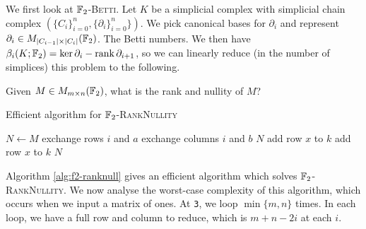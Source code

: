 We first look at \textsc{$\F_2$-Betti}. Let $K$ be a simplicial complex with simplicial chain complex $(\{C_i\}_{i=0}^n, \{\partial_i\}_{i=0}^n\})$. We pick canonical bases for $\partial_i$ and represent $\partial_i \in M_{\lvert C_{i-1} \rvert \times \lvert C_i \rvert}(\mathbb{F}_2)$. The Betti numbers. We then have $\beta_i(K; \mathbb{F}_2) = \ker\partial_i - \operatorname*{rank}\partial_{i+1}$, so we can linearly reduce (in the number of simplices) this problem to the following.

\begin{problem}[$\F_2$-RankNullity]
Given $M \in M_{m \times n}(\mathbb{F}_2)$, what is the rank and nullity of $M$?
\end{problem}

\begin{algorithm}
  \caption{Efficient algorithm for \textsc{$\F_2$-RankNullity}}
  \label{alg:f2-ranknull}
  \begin{algorithmic}[1]
      \State $N \gets M$
            \State exchange rows $i$ and $a$
            \State exchange columns $i$ and $b$
          \Else
            \State\Return $N$
          \EndIf
        \EndIf
         
            \State add row $x$ to $k$
          \EndIf
        \EndFor
         
            \State add row $x$ to $k$
          \EndIf
        \EndFor
      \EndFor
      \State\Return $N$
    \EndFunction
  \end{algorithmic}
\end{algorithm}

Algorithm \ref{alg:f2-ranknull} gives an efficient algorithm which solves \textsc{$\F_2$-RankNullity}. We now analyse the worst-case complexity of this algorithm, which occurs when we input a matrix of ones. At \texttt{3}, we loop $\min\{m, n\}$ times. In each loop, we have a full row and column to reduce, which is $m + n - 2i$ at each $i$. 